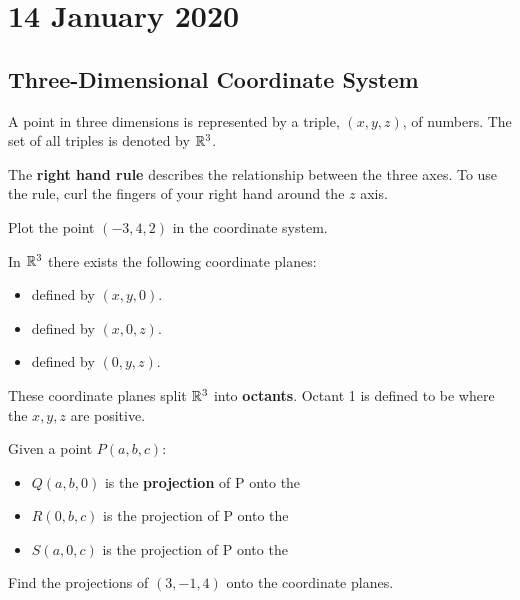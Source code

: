 \documentclass[twoside]{report}
\begin{document}
    \maketitle
    \chapter{14 January 2020}
    \section{Three-Dimensional Coordinate System}
    \begin{definition}
        A point in three dimensions is represented by a triple, $(x, y, z)$, of numbers. The set of all triples is denoted by $\mathbb{R}^{3}$.
    \end{definition}
    \begin{definition}
        The \textbf{right hand rule} describes the relationship between the three axes. To use the rule, curl the fingers of your right hand around the $z$ axis.
    \end{definition}
    \begin{example}
        Plot the point $(-3, 4, 2)$ in the coordinate system.
    \end{example}
    \np
    \begin{definition}
        In $\mathbb{R}^{3}$ there exists the following coordinate planes:
        \begin{itemize}
            \item \xy defined by $(x, y, 0)$.
            \item \xz defined by $(x, 0, z)$.
            \item \yz defined by $(0, y, z)$.
        \end{itemize}
        These coordinate planes split $\mathbb{R}^{3}$ into \textbf{octants}. Octant 1 is defined to be where the $x, y, z$ are positive.
    \end{definition}
    \begin{definition}
        Given a point $P(a, b, c)$:
        \begin{itemize}
            \item $Q(a, b, 0)$ is the \textbf{projection} of P onto the \xy
            \item $R(0, b, c)$ is the projection of P onto the \yz
            \item $S(a, 0, c)$ is the projection of P onto the \xz
        \end{itemize}
    \end{definition}
    \begin{example}
        Find the projections of $(3, -1, 4)$ onto the coordinate planes.
    \end{example}
\end{document}
